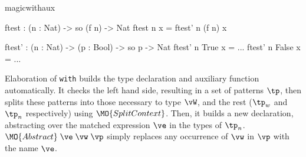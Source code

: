\begin{SaveVerbatim}{magicwithaux}

ftest : (n : Nat) -> so (f n) -> Nat
ftest n x = ftest' n (f n) x

ftest' : (n : Nat) -> (p : Bool) -> so p -> Nat
ftest' n True  x = ... 
ftest' n False x = ... 

\end{SaveVerbatim}

\noindent
Elaboration of \texttt{with} builds the type declaration and auxiliary function
automatically. It checks the left hand side, resulting in a set of patterns
$\tp$, then splits these patterns into those necessary to type
$\vW$, and the rest ($\tp_w$ and $\tp_n$ respectively) using
$\MO{SplitContext}$. Then, it builds a new declaration, abstracting over
the matched expression $\ve$ in the types of $\tp_n$.
$\MO{Abstract}\;\ve\;\vw\;\vp$ simply replaces any occurrence of $\vw$ in
$\vp$ with the name $\ve$.


